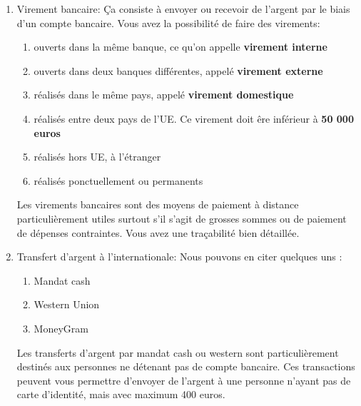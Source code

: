 \documentclass[12pt]{report}
\begin{document}
\begin{enumerate}
    \item Virement bancaire: Ça consiste à envoyer ou recevoir de l'argent par le biais d'un compte bancaire. Vous avez la possibilité de faire des virements: 
    
    \begin{enumerate}
        \item ouverts dans la même banque, ce qu'on appelle \textbf{virement interne}
        \item ouverts dans deux banques différentes, appelé \textbf{virement externe}
        \item réalisés dans le même pays, appelé \textbf{virement domestique}
        \item réalisés entre deux pays de l'UE. Ce virement doit êre inférieur à \textbf{50 000 euros}
        \item réalisés hors UE, à l'étranger
        \item réalisés ponctuellement ou permanents 
    \end{enumerate}
Les virements bancaires sont des moyens de paiement à distance particulièrement utiles surtout s'il s'agit de grosses sommes ou de paiement de dépenses contraintes. Vous avez une traçabilité bien détaillée.\\

    \item Transfert d'argent à l'internationale: Nous pouvons en citer quelques uns : 
    
    \begin{enumerate}
        \item Mandat cash
        \item Western Union
        \item MoneyGram 
    \end{enumerate}
    
Les transferts d'argent par mandat cash ou western sont particulièrement destinés aux personnes ne détenant pas de compte bancaire. Ces transactions peuvent vous permettre d'envoyer de l'argent à une personne n'ayant pas de carte d'identité, mais avec maximum 400 euros.\\
    
\end{enumerate}
\end{document}
